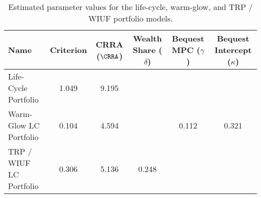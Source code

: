 \begin{table}\centering
    \begin{tabular}{lccccc}
        \toprule
        Name                   & Criterion & CRRA ($\CRRA $) & Wealth Share ($\delta $) & Bequest MPC ($ \gamma $) & Bequest Intercept ($ \kappa $) \\
        \midrule
        Life-Cycle Portfolio   & 1.049     & 9.195          &                         &                           &                                 \\
        Warm-Glow LC Portfolio & 0.104     & 4.594          &                         & 0.112                     & 0.321                          \\
        TRP / WIUF LC Portfolio       & 0.306     & 5.136          & 0.248                   &                           &                                 \\
        \bottomrule
    \end{tabular}
    \caption{Estimated parameter values for the life-cycle, warm-glow, and TRP / WIUF portfolio models.}
    \label{parameters}
\end{table}